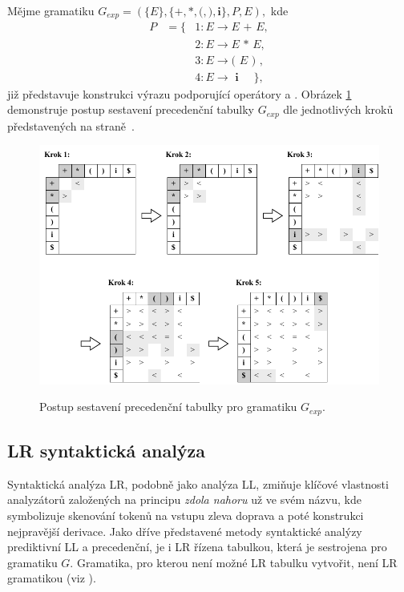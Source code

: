 \begin{priklad}
  Mějme gramatiku $G_{exp} = (\{E\}, \{\textbf{+}, \textbf{*}, \textbf{(} , \textbf{)}, \textbf{i}\}, P, E),$ kde
  \begin{eqnarray*}
    P & = \{ & 1\!: E \rightarrow E \textbf{ + } E, \\
      &      & 2\!: E \rightarrow E \textbf{ * } E, \\
      &      & 3\!: E \rightarrow \textbf{( } E \textbf{ ) }, \\
      &      & 4\!: E \rightarrow \textbf{ i }\quad\},
  \end{eqnarray*}
  již představuje konstrukci výrazu podporující operátory \uv{$+$} a \uv{$-$}. Obrázek \ref{obrPrecedencni} demonstruje postup sestavení precedenční tabulky $G_{exp}$
  dle jednotlivých kroků představených na straně~\pageref{postupKonstrukcePrec}.

  \begin{figure}[h]\centering
    \centering
    \includegraphics[scale=1.05]{obrazky/PrikladPrecedencni.pdf}\\[1pt]
    \caption{Postup sestavení precedenční tabulky pro gramatiku $G_{exp}$.}
    \label{obrPrecedencni}
  \end{figure}
\end{priklad}

\subsection*{LR syntaktická analýza}
Syntaktická analýza LR, podobně jako analýza LL, zmiňuje klíčové vlastnosti analyzátorů založených na principu \emph{zdola nahoru} už ve svém názvu, kde 
symbolizuje skenování tokenů na vstupu zleva doprava a  poté konstrukci nejpravější derivace. Jako dříve představené metody syntaktické analýzy prediktivní LL a precedenční,
je i LR řízena tabulkou, která je sestrojena pro gramatiku $G$. Gramatika, pro kterou není možné LR tabulku vytvořit, není LR gramatikou (viz \cite{Meduna:2008:ElementsOfCompilerDesign}).

